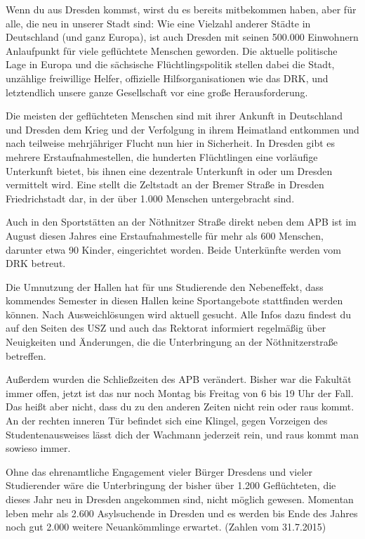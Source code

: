 
Wenn du aus Dresden kommst, wirst du es bereits mitbekommen haben, aber für alle, die neu in unserer Stadt sind: Wie eine Vielzahl anderer Städte in Deutschland (und ganz Europa), ist auch Dresden mit seinen 500.000 Einwohnern Anlaufpunkt für viele geflüchtete Menschen geworden. Die aktuelle politische Lage in Europa und die sächsische Flüchtlingspolitik stellen dabei die Stadt, unzählige freiwillige Helfer, offizielle Hilfsorganisationen wie das DRK, und letztendlich unsere ganze Gesellschaft vor eine große Herausforderung. 

Die meisten der geflüchteten Menschen sind mit ihrer Ankunft in Deutschland und Dresden dem Krieg und der Verfolgung in ihrem Heimatland entkommen und nach teilweise mehrjähriger Flucht nun hier in Sicherheit. In Dresden gibt es mehrere Erstaufnahmestellen, die hunderten Flüchtlingen eine vorläufige Unterkunft bietet, bis ihnen eine dezentrale Unterkunft in oder um Dresden vermittelt wird. Eine stellt die Zeltstadt an der Bremer Straße in Dresden Friedrichstadt dar, in der über 1.000 Menschen untergebracht sind.

Auch in den Sportstätten an der Nöthnitzer Straße direkt neben dem APB ist im August diesen Jahres eine Erstaufnahmestelle für mehr als 600 Menschen, darunter etwa 90 Kinder, eingerichtet worden.   Beide Unterkünfte werden vom DRK betreut.

Die Umnutzung der Hallen hat für uns Studierende den Nebeneffekt, dass kommendes Semester in diesen Hallen keine Sportangebote stattfinden werden können. Nach Ausweichlösungen wird aktuell gesucht. Alle Infos dazu findest du auf den Seiten des USZ  und auch das Rektorat informiert regelmäßig über Neuigkeiten und Änderungen, die die Unterbringung an der Nöthnitzerstraße betreffen. 

Außerdem wurden die Schließzeiten des APB verändert. Bisher war die Fakultät immer offen, jetzt ist das nur noch Montag bis Freitag von 6 bis 19 Uhr der Fall. Das heißt aber nicht, dass du zu den anderen Zeiten nicht rein oder raus kommt. An der rechten inneren Tür befindet sich eine Klingel, gegen Vorzeigen des Studentenausweises lässt dich der Wachmann jederzeit rein, und raus kommt man sowieso immer.

Ohne das ehrenamtliche Engagement vieler Bürger Dresdens und vieler Studierender wäre die Unterbringung der bisher über 1.200 Geflüchteten, die dieses Jahr neu in Dresden angekommen sind, nicht möglich gewesen. Momentan leben mehr als 2.600 Asylsuchende in Dresden und es werden bis Ende des Jahres noch gut 2.000 weitere Neuankömmlinge erwartet.  (Zahlen vom 31.7.2015) 

